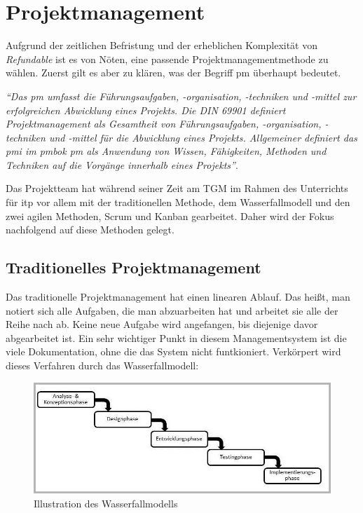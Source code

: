 \chapter{Projektmanagement}
Aufgrund der zeitlichen Befristung und der erheblichen Komplexität von \textit{Refundable} ist es von Nöten, eine passende Projektmanagementmethode zu wählen. Zuerst gilt es aber zu klären, was der Begriff \Gls{pm} überhaupt bedeutet.\\
\begin{center}
	\textit{\enquote{Das \Gls{pm} umfasst die Führungsaufgaben, -organisation, -techniken und -mittel zur erfolgreichen Abwicklung eines Projekts. Die DIN 69901 definiert Projektmanagement als Gesamtheit von Führungsaufgaben, -organisation, -techniken und -mittel für die Abwicklung eines Projekts. Allgemeiner definiert das \Gls{pmi} im \Gls{pmbok} \Gls{pm} als Anwendung von Wissen, Fähigkeiten, Methoden und Techniken auf die Vorgänge innerhalb eines Projekts}}\cite{pm-definition}.
\end{center}
Das Projektteam hat während seiner Zeit am TGM im Rahmen des Unterrichts für \Gls{itp} vor allem mit der traditionellen Methode, dem Wasserfallmodell und den zwei agilen Methoden, Scrum und Kanban gearbeitet. Daher wird der Fokus nachfolgend auf diese Methoden gelegt.
\newpage
\section{Traditionelles Projektmanagement}
\label{chapter:tradi-pm}
Das traditionelle Projektmanagement hat einen linearen Ablauf. Das heißt, man notiert sich alle Aufgaben, die man abzuarbeiten hat und arbeitet sie alle der Reihe nach ab. Keine neue Aufgabe wird angefangen, bis diejenige davor abgearbeitet ist. Ein sehr wichtiger Punkt in diesem Managementsystem ist die viele Dokumentation, ohne die das System nicht funtkioniert. Verkörpert wird dieses Verfahren durch das Wasserfallmodell:
\begin{figure}[H]
	\centering
	\includegraphics[width=0.7\linewidth]{images/projektmanagement/wasserfallmodell}
	\caption[Wasserfallmodell]{Illustration des Wasserfallmodells \cite{pm-wasserfall-online}}
	\label{fig:wasserfall}
\end{figure}

